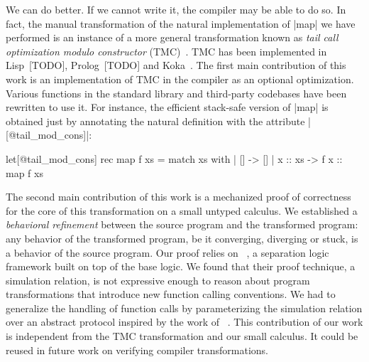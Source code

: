 We can do better.
%
If we cannot write it, the compiler may be able to do so.
%
In fact, the manual transformation of the natural implementation of \ocaml|map| we have performed is an instance of a more general transformation known as \emph{tail call optimization modulo constructor} (TMC)~\cite{risch-73,friedman-wise-75}.
%
TMC has been implemented in Lisp~[TODO], Prolog~[TODO] and Koka~\cite{DBLP:journals/pacmpl/LeijenL23}.
%
The first main contribution of this work is an implementation of TMC in the \OCaml compiler as an optional optimization.
%
Various functions in the standard library and third-party codebases have been rewritten to use it.
%
For instance, the efficient stack-safe version of \ocaml|map| is obtained just by annotating the natural definition with the attribute \ocaml|[@tail_mod_cons]|:

\begin{Ocaml}
let[@tail_mod_cons] rec map f xs =
  match xs with
  | [] -> []
  | x :: xs -> f x :: map f xs
\end{Ocaml}

The second main contribution of this work is a mechanized proof of correctness for the core of this transformation on a small untyped calculus.
%
We established a \emph{behavioral refinement} between the source program and the transformed program: any behavior of the transformed program, be it converging, diverging or stuck, is a behavior of the source program.
%
Our proof relies on \Simuliris~\cite{DBLP:journals/pacmpl/GaherSSJDKKD22}, a separation logic framework built on top of the \Iris base logic.
%
We found that their proof technique, a simulation relation, is not expressive enough to reason about program transformations that introduce new function calling conventions.
%
We had to generalize the \Simuliris handling of function calls by parameterizing the simulation relation over an abstract protocol inspired by the work of \citeauthor{DBLP:journals/pacmpl/VilhenaP21}~\cite{DBLP:journals/pacmpl/VilhenaP21}.
%
This contribution of our work is independent from the TMC transformation and our small calculus.
%
It could be reused in future work on verifying compiler transformations.


